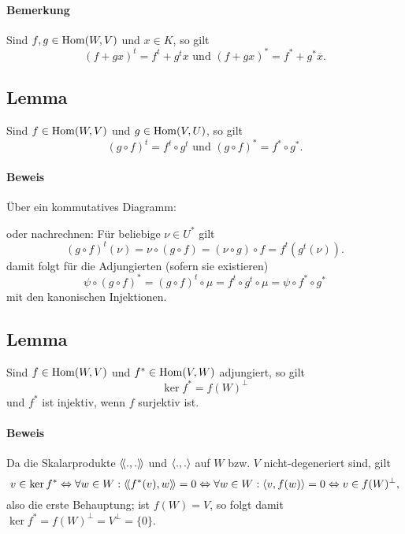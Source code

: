 \paragraph{Bemerkung}
	Sind $ f,g \in \operatorname{Hom}(W,V)$ und $ x\in K $, so gilt
		\[ (f+gx)^t = f^t+g^tx \text{ und } (f+gx)^* = f^*+g^*\overline{x}. \]
		
\subsection{Lemma}
\begin{Lemma}
	Sind $ f\in \operatorname{Hom}(W,V) $ und $ g\in \operatorname{Hom}(V,U) $, so gilt
		\[ (g\circ f)^t = f^t \circ g^t \text{ und } (g\circ f)^* = f^* \circ g^*. \]
\end{Lemma}
\paragraph{Beweis}
	Über ein kommutatives Diagramm:
     	\begin{figure}[H]\centering
     		
    	\end{figure}
	oder nachrechnen:
	Für beliebige $ \nu \in U^* $ gilt
		\[ (g\circ f)^t(\nu) = \nu \circ (g\circ f) = (\nu \circ g)\circ f = f^t(g^t(\nu)). \]	
	damit folgt für die Adjungierten (sofern sie existieren)
		\[ \psi \circ (g\circ f)^* = (g\circ f)^t \circ \mu = f^t\circ g^t \circ \mu = \psi \circ f^*\circ g^* \]
	mit den kanonischen Injektionen.

\subsection{Lemma}
\begin{Lemma}[]
	Sind $ f\in \operatorname{Hom}(W,V) $ und $ f^*\in \operatorname{Hom}(V,W) $ adjungiert, so gilt
		\[ \ker f^* = f(W)^\perp \]
	und $ f^* $ ist injektiv, wenn $ f $ surjektiv ist.
\end{Lemma}
\paragraph{Beweis}
	Da die Skalarprodukte $ \langle\! \langle .,. \rangle\! \rangle $ und $ \langle .,. \rangle $ auf $ W $ bzw. $ V $ nicht-degeneriert sind, gilt
		\[ v\in \ker f^* \Leftrightarrow \forall w\in W: \langle\! \langle f^*(v),w \rangle\! \rangle = 0 \Leftrightarrow \forall w\in W: \langle v,f(w) \rangle = 0\Leftrightarrow v\in f(W)^\perp, \]
	also die erste Behauptung; ist $ f(W)  = V$, so folgt damit $ \ker f^* = f(W)^\perp = V^\perp = \{0\} $.

